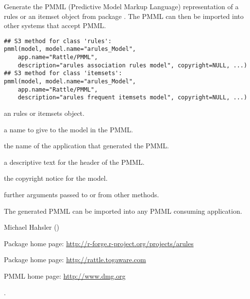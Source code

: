 \begin{Description}\relax
Generate the PMML (Predictive Model Markup Language) representation of
a rules or an itemset object from package . 
The PMML can then be imported into other systems that accept PMML.
\end{Description}
\begin{Usage}
\begin{verbatim}
## S3 method for class 'rules':
pmml(model, model.name="arules_Model", 
    app.name="Rattle/PMML",
    description="arules association rules model", copyright=NULL, ...)
## S3 method for class 'itemsets':
pmml(model, model.name="arules_Model", 
    app.name="Rattle/PMML",
    description="arules frequent itemsets model", copyright=NULL, ...)
\end{verbatim}
\end{Usage}
\begin{Arguments}
\begin{ldescription}
\item[\code{model}] an rules or itemsets object.
\item[\code{model.name}] a name to give to the model in the PMML.
\item[\code{app.name}] the name of the application that generated the PMML.
\item[\code{description}] a descriptive text for the header of the PMML.
\item[\code{copyright}] the copyright notice for the model.
\item[\code{...}] further arguments passed to or from other methods.
\end{ldescription}
\end{Arguments}
\begin{Details}\relax
The generated PMML can be imported into any PMML consuming
application.
\end{Details}
\begin{Author}\relax
Michael Hahsler ()
\end{Author}
\begin{References}\relax
Package  home page: 
\url{http://r-forge.r-project.org/projects/arules}

Package home page: \url{http://rattle.togaware.com}

PMML home page: \url{http://www.dmg.org}
\end{References}
\begin{SeeAlso}\relax
{}.
\end{SeeAlso}

